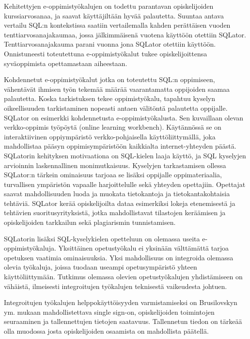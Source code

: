 \documentclass[finnish,twoside,openright]{HYgraduMLDS}
\begin{document}
Kehitettyjen e-oppimistyökalujen on todettu parantavan opiskelijoiden kurssiarvosanaa, ja saavat käyttäjiltään hyvää palautetta\cite{Brusilovsky:2010:LSP:1656255.1656257}. Suuntaa antava vertailu SQL:n kontekstissa saatiin vertailemalla kahden perättäisen vuoden tenttiarvosanajakaumaa, jossa jälkimmäisenä vuotena käyttöön otettiin SQLator\cite{sadiq2004sqlator}. Tenttiarvosanajakauma parani vuonna jona SQLator otettiin käyttöön. Onnistuneesti toteutettuna e-oppimistyökalut tukee opiskelijoittensa syväoppimista opettamastaan aiheestaan\cite{sadiq2004sqlator}.

Kohdennetut e-oppimistyökalut jotka on toteutettu SQL:n oppimiseen, vähentävät ihmisen työn tekemää määrää vaarantamatta oppijoiden saamaa palautetta. Koska tarkistuksen tekee oppimistyökalu, tapahtuu kyselyn oikeellisuuden tarkistaminen nopeasti antaen välitöntä palautetta oppijalle. SQLator on esimerkki kohdennetusta e-oppimistyökalusta\cite{sadiq2004sqlator}. Sen kuvaillaan olevan verkko-oppimis työpöytä (online learning workbench). Käytännössä se on interaktiivinen oppiympäristö verkko-pohjaisella käyttöliittymällä, joka mahdollistaa pääsyn oppimisympäristöön kaikkialta internet-yhteyden päästä. SQLatorin kehityksen motivaationa on SQL-kielen laaja käyttö, ja SQL kyselyjen arvioinnin laskennallinen monimutkaisuus. Kyselyjen tarkastamisen ollessa SQLator:n tärkein ominaisuus tarjoaa se lisäksi oppijalle oppimateriaalia, turvallisen ympäristön vapaalle harjoittelulle sekä yhteyden opettajiin. Opettajat saavat mahdollisuuden luoda ja muokata tietokantoja ja tietokantakohtaisia tehtäviä. SQLator kerää opiskelijoilta dataa esimerkiksi lokeja etenemisestä ja tehtävien suoritusyrityksistä, jotka mahdollistavat tilastojen keräämisen ja opiskelijoiden tarkkailun sekä plagiarismin tunnistamisen.

SQLatorin lisäksi SQL-kyselykielen opetteluun on olemassa useita e-oppimistyökaluja. Yksittäinen opetustyökalu ei yksinään välttämättä tarjoa opetuksen vaatimia ominaisuuksia. Yksi mahdollisuus on integroida olemassa olevia työkaluja, joissa tuodaan useampi opetusympäristö yhteen käyttöliittymään. Tutkimus olemassa olevien opetustyökalujen yhdistämiseen on vähäistä, ilmeisesti integroitujen työkalujen teknisestä vaikeudesta johtuen\cite{Brusilovsky:2010:LSP:1656255.1656257}.

Integroitujen työkalujen helppokäyttöisyyden varmistamiseksi on Brusilovskyn ym. \cite{Brusilovsky:2010:LSP:1656255.1656257} mukaan mahdollistettava single sign-on, opiskelijoiden toimintojen seuraaminen ja tallennettujen tietojen saatavuus. Tallennetun tiedon on tärkeää olla muodossa josta opiskelijoiden osaamista on mahdollista päätellä.
\end{document}
